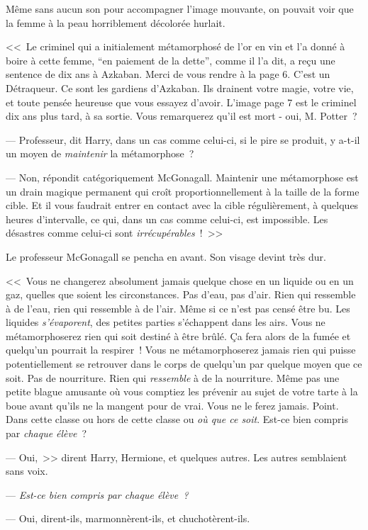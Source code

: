 Même sans aucun son pour accompagner l'image mouvante, on pouvait voir que la femme à la peau horriblement décolorée hurlait.

<<~Le criminel qui a initialement métamorphosé de l'or en vin et l'a donné à boire à cette femme, “en paiement de la dette”, comme il l'a dit, a reçu une sentence de dix ans à Azkaban. Merci de vous rendre à la page 6. C'est un Détraqueur. Ce sont les gardiens d'Azkaban. Ils drainent votre magie, votre vie, et toute pensée heureuse que vous essayez d'avoir. L'image page 7 est le criminel dix ans plus tard, à sa sortie. Vous remarquerez qu'il est mort - oui, M. Potter~?

--- Professeur, dit Harry, dans un cas comme celui-ci, si le pire se produit, y a-t-il un moyen de \emph{maintenir} la métamorphose~?

--- Non, répondit catégoriquement McGonagall. Maintenir une métamorphose est un drain magique permanent qui croît proportionnellement à la taille de la forme cible. Et il vous faudrait entrer en contact avec la cible régulièrement, à quelques heures d'intervalle, ce qui, dans un cas comme celui-ci, est impossible. Les désastres comme celui-ci sont \emph{irrécupérables}~!~>>

Le professeur McGonagall se pencha en avant. Son visage devint très dur.

<<~Vous ne changerez absolument jamais quelque chose en un liquide ou en un gaz, quelles que soient les circonstances. Pas d'eau, pas d'air. Rien qui ressemble à de l'eau, rien qui ressemble à de l'air. Même si ce n'est pas censé être bu. Les liquides \emph{s'évaporent}, des petites parties s'échappent dans les airs. Vous ne métamorphoserez rien qui soit destiné à être brûlé. Ça fera alors de la fumée et quelqu'un pourrait la respirer~! Vous ne métamorphoserez jamais rien qui puisse potentiellement se retrouver dans le corps de quelqu'un par quelque moyen que ce soit. Pas de nourriture. Rien qui \emph{ressemble} à de la nourriture. Même pas une petite blague amusante où vous comptiez les prévenir au sujet de votre tarte à la boue avant qu'ils ne la mangent pour de vrai. Vous ne le ferez jamais. Point. Dans cette classe ou hors de cette classe ou \emph{où que ce soit}. Est-ce bien compris par \emph{chaque élève}~?

--- Oui,~>> dirent Harry, Hermione, et quelques autres. Les autres semblaient sans voix.

--- \emph{Est-ce bien compris par chaque élève~?}

--- Oui, dirent-ils, marmonnèrent-ils, et chuchotèrent-ils.

